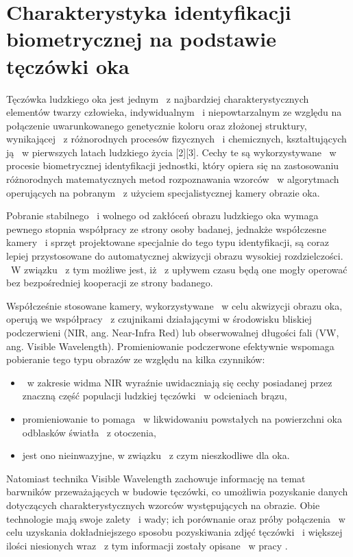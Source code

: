 
\section{Charakterystyka identyfikacji biometrycznej na podstawie tęczówki oka}
\label{sec:zawartoscPracy}


Tęczówka ludzkiego oka jest jednym ~z najbardziej charakterystycznych elementów twarzy człowieka, indywidualnym ~i niepowtarzalnym ze względu na połączenie uwarunkowanego genetycznie koloru oraz złożonej struktury, wynikającej ~z różnorodnych procesów fizycznych ~i chemicznych, kształtujących ją ~w pierwszych latach ludzkiego życia [2][3]. Cechy te są wykorzystywane ~w procesie biometrycznej identyfikacji jednostki, który opiera się na zastosowaniu różnorodnych matematycznych metod rozpoznawania wzorców ~w algorytmach operujących na pobranym ~z użyciem specjalistycznej kamery obrazie oka.

Pobranie stabilnego ~i wolnego od zakłóceń obrazu ludzkiego oka wymaga pewnego stopnia współpracy ze strony osoby badanej, jednakże współczesne kamery ~i sprzęt projektowane specjalnie do tego typu identyfikacji, są  coraz lepiej przystosowane do automatycznej akwizycji obrazu wysokiej rozdzielczości. ~W związku ~z tym możliwe jest, iż ~z upływem czasu będą one mogły operować bez bezpośredniej kooperacji ze strony badanego.

Współcześnie stosowane kamery, wykorzystywane ~w celu akwizycji obrazu oka, operują we współpracy ~z czujnikami działającymi w środowisku bliskiej podczerwieni (NIR, ang. Near-Infra Red) lub obserwowalnej długości fali (VW, ang. Visible Wavelength). Promieniowanie podczerwone efektywnie wspomaga pobieranie tego typu obrazów ze względu na kilka czynników:
\begin{itemize} 
\item ~w zakresie widma NIR wyraźnie uwidaczniają się cechy posiadanej przez znaczną część populacji ludzkiej tęczówki ~w  odcieniach brązu,
\item promieniowanie to pomaga ~w likwidowaniu powstałych na powierzchni oka odblasków światła ~z otoczenia,
\item jest ono nieinwazyjne, w związku ~z czym nieszkodliwe dla oka.
\end{itemize}
Natomiast technika Visible Wavelength zachowuje informację na temat barwników przeważających w budowie tęczówki, co umożliwia pozyskanie danych dotyczących charakterystycznych wzorców występujących na obrazie. Obie technologie mają swoje zalety ~i wady; ich porównanie oraz próby połączenia ~w celu uzyskania dokładniejszego sposobu pozyskiwania zdjęć tęczówki ~i większej ilości niesionych wraz ~z tym informacji zostały opisane ~w pracy \cite{Hos10}. 

